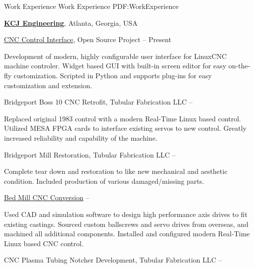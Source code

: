 \documentclass[letterpaper,MMMyyyy,nonstopmode]{resume}
\begin{document}
\begin{Body}

\Section
{Work Experience}
{Work Experience}
{PDF:WorkExperience}

\Entry
\href{http://www.kcjengr.com/}
{\textbf{KCJ Engineering}},
Atlanta, Georgia, USA

\Gap
\BulletItem
\href{https://github.com/KurtJacobson/hazzy/}{CNC Control Interface}, Open Source Project
\hfill
{} --
Present
\begin{Detail}
\SubBulletItem
Development of modern, highly configurable user interface for LinuxCNC machine controler.
\SubBulletItem
Widget based GUI with built-in screen editor for easy on-the-fly customization.
\SubBulletItem
Scripted in Python and supports plug-ins for easy customization and extension.
\end{Detail}

\Gap
{} Bridgeport Boss 10 CNC Retrofit, Tubular Fabrication LLC
\hfill
{} -- 
\begin{Detail}
\SubBulletItem
Replaced original 1983 control with a modern Real-Time Linux based control.
\SubBulletItem
Utilized MESA FPGA cards to interface existing servos to new control.
\SubBulletItem
Greatly increased reliability and capability of the machine.
\end{Detail}

\Gap
{} Bridgeport Mill Restoration, Tubular Fabrication LLC
\hfill
{} -- 
\begin{Detail}
\SubBulletItem
Complete tear down and restoration to like new mechanical and aesthetic condition.
\SubBulletItem
Included production of various damaged/missing parts.
\end{Detail}

\Gap
\BulletItem
\href{https://github.com/KurtJacobson/RF45-CNC/}{Bed Mill CNC Conversion}
\hfill
{} --
\begin{Detail}
\SubBulletItem
Used CAD and simulation software to design high performance axis drives to fit existing castings.
\SubBulletItem
Sourced custom ballscrews and servo drives from overseas, and machined all additional components.
\SubBulletItem
Installed and configured modern Real-Time Linux based CNC control.
\end{Detail}

\Gap
\BulletItem
CNC Plasma Tubing Notcher Development, Tubular Fabrication LLC
\hfill
{} --


\end{Body}
\end{document}
